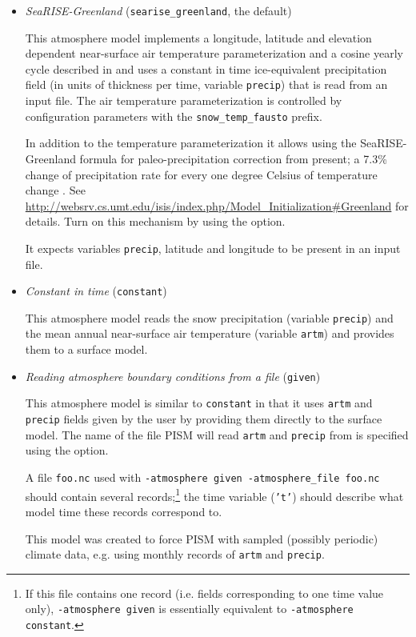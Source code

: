 \begin{itemize}
  \item \emph{SeaRISE-Greenland} (\texttt{searise_greenland}, the default)

    This atmosphere model implements a longitude, latitude and elevation dependent near-surface air temperature parameterization and a cosine yearly cycle described in \cite{Faustoetal2009} and uses a constant in time ice-equivalent precipitation field (in units of thickness per time, variable \texttt{precip}) that is read from an input file.  The air temperature parameterization is controlled by configuration parameters with the \texttt{snow_temp_fausto} prefix.

    In addition to the temperature parameterization it allows using the SeaRISE-Greenland formula for paleo-precipitation correction from present; a 7.3\% change of precipitation rate for every one degree Celsius of temperature change \cite{Huybrechts02}.  See \url{http://websrv.cs.umt.edu/isis/index.php/Model_Initialization#Greenland} for details.  Turn on this mechanism by using the  option.

    It expects variables \texttt{precip}, latitude and longitude to be present in an input file.

 \item \emph{Constant in time} (\texttt{constant})

    This atmosphere model reads the snow precipitation (variable \texttt{precip}) and the mean annual near-surface air temperature (variable \texttt{artm}) and provides them to a surface model.

  \item \emph{Reading atmosphere boundary conditions from a file} (\texttt{given})

    This atmosphere model is similar to \texttt{constant} in that it uses \texttt{artm} and \texttt{precip} fields given by the user by providing them directly to the surface model. The name of the file PISM will read \texttt{artm} and \texttt{precip} from is specified using the  option.

    A file \texttt{foo.nc} used with \texttt{-atmosphere given -atmosphere_file foo.nc} should contain several records;\footnote{If this file contains one record (i.e. fields corresponding to one time value only), \texttt{-atmosphere given} is essentially equivalent to \texttt{-atmosphere constant}.} the time variable (\texttt{'t'}) should describe what model time these records correspond to.

    This model was created to force PISM with sampled (possibly periodic) climate data, e.g. using monthly records of \texttt{artm} and \texttt{precip}.

  \end{itemize}

